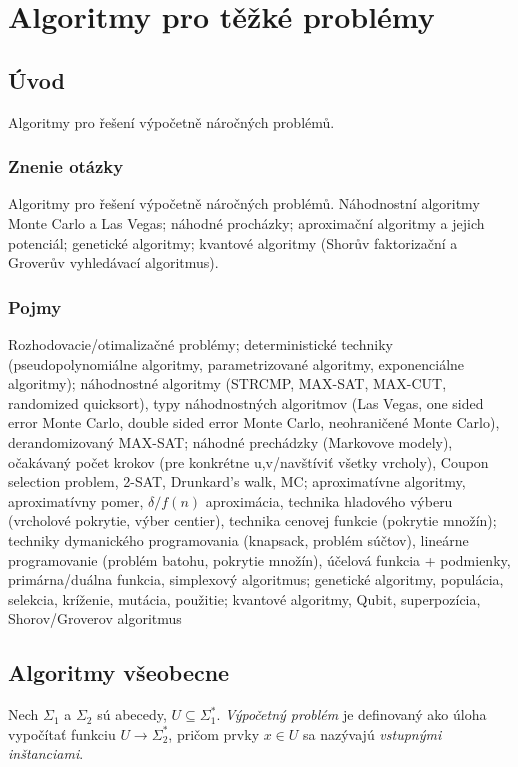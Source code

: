 \section{Algoritmy pro těžké problémy}

\subsection{Úvod}
Algoritmy pro řešení výpočetně náročných problémů.

\subsubsection{Znenie otázky}
Algoritmy pro řešení výpočetně náročných problémů. Náhodnostní 
algoritmy Monte Carlo a Las Vegas; náhodné procházky; aproximační 
algoritmy a jejich potenciál; genetické algoritmy; 
kvantové algoritmy (Shorův faktorizační a Groverův vyhledávací algoritmus).

\subsubsection{Pojmy}
Rozhodovacie/otimalizačné problémy; deterministické techniky (pseudopolynomiálne
algoritmy, parametrizované algoritmy, exponenciálne algoritmy); 
náhodnostné algoritmy (STRCMP, MAX-SAT, MAX-CUT, randomized quicksort),
typy náhodnostných algoritmov (Las Vegas, one sided error Monte Carlo, 
double sided error Monte Carlo, neohraničené Monte Carlo), derandomizovaný 
MAX-SAT; náhodné prechádzky (Markovove modely), očakávaný počet krokov 
(pre konkrétne u,v/navštíviť všetky vrcholy), Coupon selection problem, 2-SAT,
Drunkard's walk, MC; aproximatívne algoritmy, aproximatívny pomer, 
$\delta/f(n)$ aproximácia, technika hladového výberu (vrcholové pokrytie,
výber centier), technika cenovej funkcie (pokrytie množín);
techniky dymanického programovania (knapsack, problém súčtov), lineárne programovanie
(problém batohu, pokrytie množín), účelová funkcia + podmienky, primárna/duálna
funkcia, simplexový algoritmus; genetické algoritmy, populácia, selekcia, kríženie,
mutácia, použitie; kvantové algoritmy, Qubit, superpozícia, Shorov/Groverov algoritmus

\subsection{Algoritmy všeobecne}
Nech $\Sigma_1$ a $\Sigma_2$ sú abecedy, $U \subseteq \Sigma_1^*$.
{\em Výpočetný problém} je definovaný ako úloha vypočítať
funkciu $U \to \Sigma_2^*$, pričom prvky $x \in U$ sa nazývajú 
{\em vstupnými inštanciami}. 

